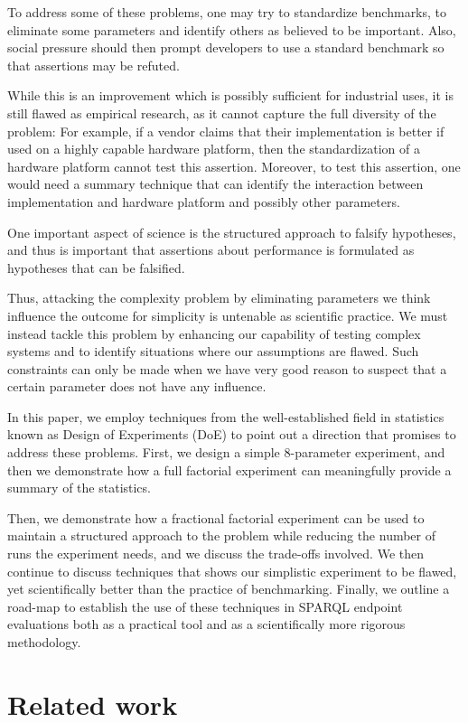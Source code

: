 \documentclass{llncs}
\begin{document}
To address some of these problems, one may try to standardize
benchmarks, to eliminate some parameters and identify others as
believed to be important. Also, social pressure should then prompt
developers to use a standard benchmark so that assertions may be
refuted.

While this is an improvement which is possibly sufficient for
industrial uses, it is still flawed as empirical
research, as it cannot capture the full diversity of the problem: For
example, if a vendor claims that their implementation is better if
used on a highly capable hardware platform, then the standardization
of a hardware platform cannot test this assertion. Moreover, to test
this assertion, one would need a summary technique that can identify
the interaction between implementation and hardware platform and
possibly other parameters.

One important aspect of science is the structured approach to falsify
hypotheses, and thus is important that assertions about performance is
formulated as hypotheses that can be falsified.

Thus, attacking the complexity problem by eliminating parameters we
think influence the outcome for simplicity is untenable as
scientific practice. We must instead tackle this problem by enhancing
our capability of testing complex systems and to identify situations
where our assumptions are flawed. Such constraints can only be made
when we have very good reason to suspect that a certain parameter does
not have any influence.

In this paper, we employ techniques from the well-established field in
statistics known as Design of Experiments (DoE) to point out a
direction that promises to address these problems. First, we design a
simple 8-parameter experiment, and then we demonstrate how a full
factorial experiment can meaningfully provide a summary of the
statistics.

Then, we demonstrate how a fractional factorial experiment can be used
to maintain a structured approach to the problem while reducing the
number of runs the experiment needs, and we discuss the trade-offs
involved. We then continue to discuss techniques that shows our
simplistic experiment to be flawed, yet scientifically better than the
practice of benchmarking. Finally, we outline a road-map to establish
the use of these techniques in SPARQL endpoint evaluations both as a
practical tool and as a scientifically more rigorous methodology.

\section{Related work}
\end{document}
